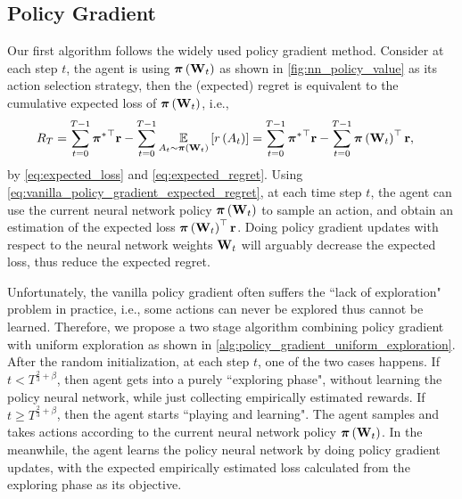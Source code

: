 \subsection{Policy Gradient}
\label{subsec:policy_gradient}

Our first algorithm follows the widely used policy gradient method. 
Consider at each step $t$, the agent is using ${\boldsymbol{\pi}}\left({\mathbf{W}}_t\right)$ as shown in \cref{fig:nn_policy_value} as its action selection strategy, then the (expected) regret is equivalent to the cumulative expected loss of ${\boldsymbol{\pi}}\left({\mathbf{W}}_t\right)$, i.e., 
\begin{equation}
\label{eq:vanilla_policy_gradient_expected_regret}
\begin{split}
    R_T &= \sum\limits_{t=0}^{T-1}{{{\boldsymbol{\pi}}^*}^\top {\mathbf{r}}} - \sum\limits_{t=0}^{T-1}{ \operatorname*{{\mathbb{E}}}\limits_{A_t \sim {\boldsymbol{\pi}}\left({\mathbf{W}}_t\right)} \left[ r\left(A_t\right) \right] } = \sum\limits_{t=0}^{T-1}{{{\boldsymbol{\pi}}^*}^\top {\mathbf{r}}} - \sum\limits_{t=0}^{T-1}{{\boldsymbol{\pi}}\left({\mathbf{W}}_t\right)^\top {\mathbf{r}}},
\end{split}
\end{equation}
by \cref{eq:expected_loss} and \cref{eq:expected_regret}. Using \cref{eq:vanilla_policy_gradient_expected_regret}, at each time step $t$, the agent can use the current neural network policy ${\boldsymbol{\pi}}\left({\mathbf{W}}_t\right)$ to sample an action, and obtain an estimation of the expected loss ${\boldsymbol{\pi}}\left({\mathbf{W}}_t\right)^\top {\mathbf{r}}$. Doing policy gradient updates with respect to the neural network weights ${\mathbf{W}}_t$ will arguably decrease the expected loss, thus reduce the expected regret. 

Unfortunately, the vanilla policy gradient often suffers the ``lack of exploration" problem in practice, i.e., some actions can never be explored thus cannot be learned. Therefore, we propose a two stage algorithm combining policy gradient with uniform exploration as shown in \cref{alg:policy_gradient_uniform_exploration}. After the random initialization, at each step $t$, one of the two cases happens. If $t < T^{\frac{2}{3} + \beta}$, then agent gets into a purely ``exploring phase", without learning the policy neural network, while just collecting empirically estimated rewards. If $t \ge T^{\frac{2}{3} + \beta}$, then the agent starts ``playing and learning". The agent samples and takes actions according to the current neural network policy ${\boldsymbol{\pi}}\left({\mathbf{W}}_t\right)$. In the meanwhile, the agent learns the policy neural network by doing policy gradient updates, with the expected empirically estimated loss calculated from the exploring phase as its objective.

